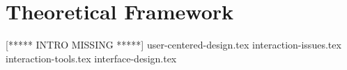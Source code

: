 \chapter{Theoretical Framework}
[***** INTRO MISSING *****]
{user-centered-design.tex}
{interaction-issues.tex}
{interaction-tools.tex}
{interface-design.tex}
